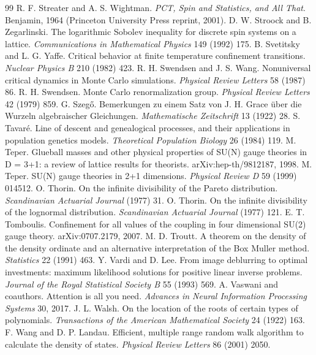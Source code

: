 \begin{thebibliography}{99}
 R. F. Streater and A. S. Wightman. \emph{PCT, Spin and Statistics, and All That}. Benjamin, 1964 (Princeton University Press reprint, 2001).
 D. W. Stroock and B. Zegarlinski. The logarithmic Sobolev inequality for discrete spin systems on a lattice. \emph{Communications in Mathematical Physics} 149 (1992) 175.
 B. Svetitsky and L. G. Yaffe. Critical behavior at finite temperature confinement transitions. \emph{Nuclear Physics B} 210 (1982) 423.
 R. H. Swendsen and J. S. Wang. Nonuniversal critical dynamics in Monte Carlo simulations. \emph{Physical Review Letters} 58 (1987) 86.
 R. H. Swendsen. Monte Carlo renormalization group. \emph{Physical Review Letters} 42 (1979) 859.
 G. Szeg\H o. Bemerkungen zu einem Satz von J. H. Grace \"uber die Wurzeln algebraischer Gleichungen. \emph{Mathematische Zeitschrift} 13 (1922) 28.
 S. Tavar\'e. Line of descent and genealogical processes, and their applications in population genetics models. \emph{Theoretical Population Biology} 26 (1984) 119.
 M. Teper. Glueball masses and other physical properties of SU(N) gauge theories in D = 3+1: a review of lattice results for theorists. arXiv:hep-th/9812187, 1998.
 M. Teper. SU(N) gauge theories in 2+1 dimensions. \emph{Physical Review D} 59 (1999) 014512.
 O. Thorin. On the infinite divisibility of the Pareto distribution. \emph{Scandinavian Actuarial Journal} (1977) 31.
 O. Thorin. On the infinite divisibility of the lognormal distribution. \emph{Scandinavian Actuarial Journal} (1977) 121.
 E. T. Tomboulis. Confinement for all values of the coupling in four dimensional SU(2) gauge theory. arXiv:0707.2179, 2007.
 M. D. Troutt. A theorem on the density of the density ordinate and an alternative interpretation of the Box Muller method. \emph{Statistics} 22 (1991) 463.
 Y. Vardi and D. Lee. From image deblurring to optimal investments: maximum likelihood solutions for positive linear inverse problems. \emph{Journal of the Royal Statistical Society B} 55 (1993) 569.
 A. Vaswani and coauthors. Attention is all you need. \emph{Advances in Neural Information Processing Systems} 30, 2017.
 J. L. Walsh. On the location of the roots of certain types of polynomials. \emph{Transactions of the American Mathematical Society} 24 (1922) 163.
 F. Wang and D. P. Landau. Efficient, multiple range random walk algorithm to calculate the density of states. \emph{Physical Review Letters} 86 (2001) 2050.

\end{thebibliography}
